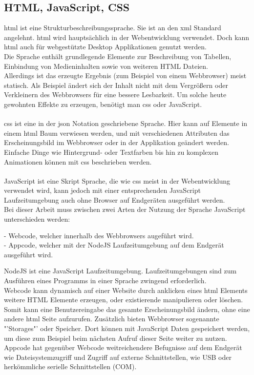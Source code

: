 \documentclass[11pt]{scrartcl}
\begin{document}
\subsection{HTML, JavaScript, CSS}
\ac{html} ist eine Strukturbeschreibungssprache. Sie ist an den \ac{xml} Standard angelehnt. \ac{html}
wird hauptsächlich in der Webentwicklung verwendet. Doch kann \ac{html} auch für webgestützte Desktop
Applikationen genutzt werden.\\
Die Sprache enthält grundlegende Elemente zur Beschreibung von Tabellen, Einbindung von Medieninhalten sowie
von weiteren HTML Dateien.\\
Allerdings ist das erzeugte Ergebnis (zum Beispiel von einem Webbrowser) meist statisch. Als Beispiel ändert sich
der Inhalt nicht mit dem Vergrößern oder Verkleinern des Webbrowsers für eine bessere Lesbarkeit. Um solche heute
gewohnten Effekte zu erzeugen, benötigt man \ac{css} oder JavaScript.\\
\\
\ac{css} ist eine in der \ac{json} Notation geschriebene Sprache. Hier kann auf Elemente in einem \ac{html} Baum
verwiesen werden, und mit verschiedenen Attributen das Erscheinungsbild im Webbrowser oder in der Applikation
geändert werden.\\
Einfache Dinge wie Hintergrund- oder Textfarben bis hin zu komplexen Animationen können mit \ac{css} beschrieben
werden.\\
\\
JavaScript ist eine Skript Sprache, die wie \ac{css} meist in der Webentwicklung verwendet wird, kann jedoch
mit einer entsprechenden JavaScript Laufzeitumgebung auch ohne Browser auf Endgeräten ausgeführt werden.\\
Bei dieser Arbeit muss zwischen zwei Arten der Nutzung der Sprache JavaScript unterschieden werden:\\
\begin{addmargin}[2em]{0em}
 - Webcode, welcher innerhalb des Webbrowsers augeführt wird.\\
 - Appcode, welcher mit der NodeJS Laufzeitumgebung auf dem Endgerät ausgeführt wird.\\
\end{addmargin}
NodeJS ist eine JavaScript Laufzeitumgebung. Laufzeitumgebungen sind zum Ausführen eines Programms in einer
Sprache zwingend erforderlich.\\
Webcode kann dynamisch auf einer Website durch anklicken eines \ac{html} Elements weitere HTML Elemente erzeugen,
oder existierende manipulieren oder löschen. Somit kann eine Benutzereingabe das gesamte Erscheinungsbild ändern,
ohne eine andere \ac{html} Seite aufzurufen.
Zusätzlich bieten Webbrowser sogenannte "'Storages"' oder Speicher. Dort können mit JavaScript Daten gespeichert werden,
um diese zum Beispiel beim nächsten Aufruf dieser Seite weiter zu nutzen.\\
Appcode hat gegenüber Webcode weitreichendere Befugnisse auf dem Endgerät wie Dateisystemzugriff und Zugriff auf
externe Schnittstellen, wie USB oder herkömmliche serielle Schnittstellen (COM).
\clearpage
\end{document}
